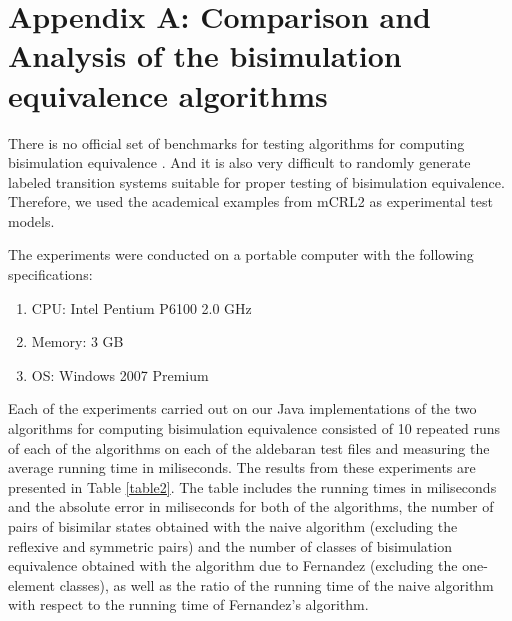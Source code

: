 \section*{Appendix A: Comparison and Analysis of the bisimulation equivalence algorithms}

There is no official set of benchmarks for testing algorithms for computing bisimulation equivalence \cite{PiazzaPolicriti}. And it is also very difficult to randomly generate labeled transition systems suitable for proper testing of bisimulation equivalence. Therefore, we used the academical examples from mCRL2 as experimental test models. 

The experiments were conducted on a portable computer with the following specifications: 
\begin{enumerate}
	\item CPU: Intel Pentium P6100 2.0 GHz
	\item Memory: 3 GB
	\item OS: Windows 2007 Premium
\end{enumerate}

Each of the experiments carried out on our Java implementations of the two algorithms for computing bisimulation equivalence consisted of 10 repeated runs of each of the algorithms on each of the aldebaran test files and measuring the average running time in miliseconds. 
The results from these experiments are presented in Table \ref{table2}. The table includes the running times in miliseconds and the absolute error in miliseconds for both of the algorithms, the number of pairs of bisimilar states obtained with the naive algorithm (excluding the reflexive and symmetric pairs) and the number of classes of bisimulation equivalence obtained with the algorithm due to Fernandez (excluding the one-element classes), as well as the ratio of the running time of the naive algorithm with respect to the running time of Fernandez's algorithm.

